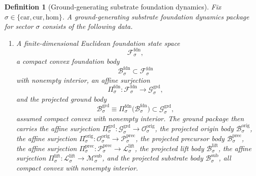 \documentclass[11pt]{article}
\newcommand{\Car}{\mathrm{car}}
\newcommand{\Cur}{\mathrm{cur}}
\newcommand{\Hom}{\mathrm{hom}}
\newcommand{\SubSpace}[1]{\mathcal M_{#1}^{\mathrm{sub}}}
\newcommand{\SubBody}[1]{\mathcal B_{#1}^{\mathrm{sub}}}
\newcommand{\LiftSpace}[1]{\mathcal L_{#1}^{\mathrm{lift}}}
\newcommand{\LiftBody}[1]{\mathcal B_{#1}^{\mathrm{lift}}}
\newcommand{\LiftProj}[1]{\Pi_{#1}^{\mathrm{lift}}}
\newcommand{\PrecSpace}[1]{\mathcal P_{#1}^{\mathrm{prec}}}
\newcommand{\PrecBody}[1]{\mathcal B_{#1}^{\mathrm{prec}}}
\newcommand{\PrecProj}[1]{\Pi_{#1}^{\mathrm{prec}}}
\newcommand{\OrigSpace}[1]{\mathcal O_{#1}^{\mathrm{orig}}}
\newcommand{\OrigBody}[1]{\mathcal B_{#1}^{\mathrm{orig}}}
\newcommand{\OrigProj}[1]{\Pi_{#1}^{\mathrm{orig}}}
\newcommand{\GroundSpace}[1]{\mathcal G_{#1}^{\mathrm{grd}}}
\newcommand{\GroundBody}[1]{\mathcal B_{#1}^{\mathrm{grd}}}
\newcommand{\GroundProj}[1]{\Pi_{#1}^{\mathrm{grd}}}
\newcommand{\FoundSpace}[1]{\mathcal F_{#1}^{\mathrm{fdn}}}
\newcommand{\FoundBody}[1]{\mathcal B_{#1}^{\mathrm{fdn}}}
\newcommand{\FoundProj}[1]{\Pi_{#1}^{\mathrm{fdn}}}
\newtheorem{definition}{Definition}
\begin{document}
\begin{definition}[Ground-generating substrate foundation dynamics]
\label{def:foundation}
Fix \(\sigma\in\{\Car,\Cur,\Hom\}\). A \emph{ground-generating substrate foundation dynamics package} for sector \(\sigma\) consists of the following data.
\begin{enumerate}
    \item A finite-dimensional Euclidean foundation state space
    \[
    \FoundSpace{\sigma},
    \]
    a compact convex foundation body
    \[
    \FoundBody{\sigma}\subset\FoundSpace{\sigma}
    \]
    with nonempty interior, an affine surjection
    \[
    \FoundProj{\sigma}:\FoundSpace{\sigma}\to\GroundSpace{\sigma},
    \]
    and the projected ground body
    \[
    \GroundBody{\sigma}
    \equiv
    \FoundProj{\sigma}\bigl(\FoundBody{\sigma}\bigr)
    \subset\GroundSpace{\sigma},
    \]
    assumed compact convex with nonempty interior. The ground package then carries the affine surjection \(\GroundProj{\sigma}:\GroundSpace{\sigma}\to\OrigSpace{\sigma}\), the projected origin body \(\OrigBody{\sigma}\), the affine surjection \(\OrigProj{\sigma}:\OrigSpace{\sigma}\to\PrecSpace{\sigma}\), the projected precursor body \(\PrecBody{\sigma}\), the affine surjection \(\PrecProj{\sigma}:\PrecSpace{\sigma}\to\LiftSpace{\sigma}\), the projected lift body \(\LiftBody{\sigma}\), the affine surjection \(\LiftProj{\sigma}:\LiftSpace{\sigma}\to\SubSpace{\sigma}\), and the projected substrate body \(\SubBody{\sigma}\), all compact convex with nonempty interior.


\end{enumerate}
\end{definition}
\end{document}
